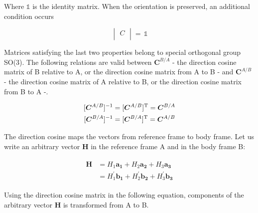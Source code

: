 Where $\mathds{1}$ is the identity matrix.
When the orientation is preserved, an additional condition occurs

\begin{equation}
\label{eqn:noRotation}
\begin{vmatrix}
C\\[0.01em]
\end{vmatrix}
=\,
\mathds{1}
\end{equation}

Matrices satisfying the last two properties belong to special orthogonal group SO(3). 
The following relations are valid between $\bm{C}^{B/A}$ - the direction cosine matrix of B relative to A, or the direction cosine matrix from A to B - and $\bm{C}^{A/B}$ - the direction cosine matrix of A relative to B, or the direction cosine matrix from B to A -.

\begin{align}
\label{eqn:C_B_A_vs_C_A_B}
\begin{split}
[\bm{C}^{A/B}]^{-1} = [\bm{C}^{A/B}]^{\rm T} = \bm{C}^{B/A} 
\\
[\bm{C}^{B/A}]^{-1} = [\bm{C}^{B/A}]^{\rm T} = \bm{C}^{A/B}
\end{split}
\end{align}

The direction cosine maps the vectors from reference frame to body frame.  
Let us write an arbitrary vector $\bm{H}$ in the reference frame A and in the body frame B:

\begin{align}
\label{eqn:vectorInRefFrame}
\begin{split}
\bm{H} & = H_1 \bm{a_1} + H_2 \bm{a_2} + H_3 \bm{a_3}
\\
& = H_1^{'} \bm{b_1} + H_2^{'} \bm{b_2} + H_3^{'} \bm{b_3}
\end{split}
\end{align}

Using the direction cosine matrix in the following equation, components of the arbitrary vector $\bm{H}$ is transformed from A to B.

